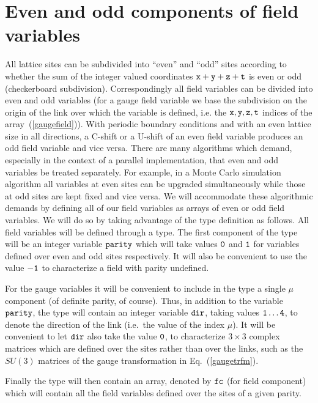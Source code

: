 \section{Even and odd components of field variables}
\label{evenand}

All lattice sites can be subdivided into ``even'' and ``odd'' sites
according to whether the sum of the integer valued coordinates
$\tt x+y+z+t$ is even or odd (checkerboard subdivision).  
Correspondingly all field variables can
be divided into even and odd variables (for a gauge field variable
we base the subdivision on the origin of the link over which the variable 
is defined, i.e. the $\tt x,y,z,t$ indices of the array~(\ref{gaugefield})).
With periodic boundary conditions and with an even lattice size in
all directions, a C-shift or a U-shift of an even field variable produces
an odd field variable and vice versa.  There are many algorithms which
demand, especially in the context of a parallel implementation, that
even and odd variables be treated separately.  For example, in a Monte
Carlo simulation algorithm all variables at even sites can be upgraded
simultaneously while those at odd sites are kept fixed and vice versa.
We will accommodate these algorithmic demands by defining all of
our field variables as arrays of even or odd field variables.
We will do so by taking advantage of the type definition as follows.
All field variables will be defined through a type.  The first component
of the type will be an integer variable $\tt parity$ which will take
values $\tt 0$ and $\tt 1$ for variables defined over even and odd 
sites respectively.
It will also be convenient to use the value $\tt -1$ to characterize
a field with parity undefined.

For the gauge variables it will be convenient
to include in the type a single $\mu$ component (of definite parity,
of course).  Thus, in addition to the variable $\tt parity$,
the type will contain an integer variable $\tt dir$, 
taking values $\tt 1 \dots 4$, to denote the direction of the link 
(i.e.~the value of the index $\mu$).  It will be convenient to let
$\tt dir$ also take the value $\tt 0$, to characterize $3 \times 3$
complex matrices which are defined over the sites rather than
over the links, such as the $SU(3)$ matrices of the gauge transformation
in Eq.~(\ref{gaugetrfm}).

Finally the type will then contain an array, denoted by $\tt fc$ 
(for field component) which will contain all the field variables
defined over the sites of a given parity.

